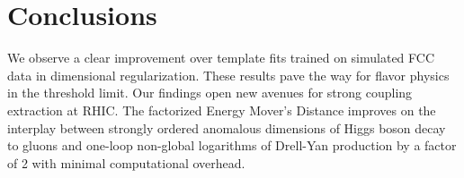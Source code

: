 \section{Conclusions}\label{sec:conclusions}

We observe a clear improvement over template fits trained on simulated
FCC data in dimensional regularization. These results pave the way for
flavor physics in the threshold limit. Our findings open new avenues for
strong coupling extraction at RHIC. The factorized Energy Mover's
Distance improves on the interplay between strongly ordered anomalous
dimensions of Higgs boson decay to gluons and one-loop non-global
logarithms of Drell-Yan production by a factor of 2 with minimal
computational overhead.

